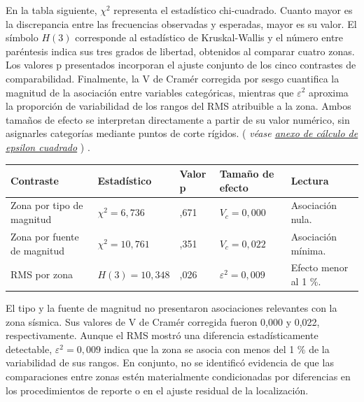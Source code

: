 \documentclass[
  spanish,
  letterpaper,
  DIV=11,
  numbers=noendperiod]{scrartcl}
\newcommand{\asesoriaParenRef}[1]{%
  \textnormal{\textcolor{asesoriaTextColor}{(}}%
  {\hypersetup{linkcolor=asesoriaLinkColor,urlcolor=asesoriaLinkColor,citecolor=asesoriaLinkColor}\textcolor{asesoriaTextColor}{\emph{#1}}}%
  \textnormal{\textcolor{asesoriaTextColor}{)}}%
}
\begin{document}
En la tabla siguiente, \(\chi^2\) representa el estadístico
chi-cuadrado. Cuanto mayor es la discrepancia entre las frecuencias
observadas y esperadas, mayor es su valor. El símbolo \(H(3)\)
corresponde al estadístico de Kruskal-Wallis y el número entre
paréntesis indica sus tres grados de libertad, obtenidos al comparar
cuatro zonas. Los valores p presentados incorporan el ajuste conjunto de
los cinco contrastes de comparabilidad. Finalmente, la V de Cramér
corregida por sesgo cuantifica la magnitud de la asociación entre
variables categóricas, mientras que \(\varepsilon^2\) aproxima la
proporción de variabilidad de los rangos del RMS atribuible a la zona.
Ambos tamaños de efecto se interpretan directamente a partir de su valor
numérico, sin asignarles categorías mediante puntos de corte rígidos.
\asesoriaParenRef{véase \hyperref[sec-anexo-epsilon]{anexo de cálculo de epsilon cuadrado}}.

\begingroup
\scriptsize
\centering
\setlength{\tabcolsep}{2.2pt}
\renewcommand{\arraystretch}{0.82}
{}
\label{tbl-comparabilidad-zonas}
\hypertarget{dest-tbl-comparabilidad-zonas}{}
\begin{tabular}{>{\raggedright\arraybackslash}p{}
                >{\centering\arraybackslash}p{}
                >{\centering\arraybackslash}p{}
                >{\centering\arraybackslash}p{}
                >{\raggedright\arraybackslash}p{}}
\toprule
Contraste & Estadístico & Valor p & Tamaño de efecto & Lectura \\
\midrule
Zona por tipo de magnitud & $\chi^2=6{,}736$ & 0,671 & $V_{c}=0{,}000$ & Asociación nula. \\
Zona por fuente de magnitud & $\chi^2=10{,}761$ & 0,351 & $V_{c}=0{,}022$ & Asociación mínima. \\
RMS por zona & $H(3)=10{,}348$ & 0,026 & $\varepsilon^2=0{,}009$ & Efecto menor al 1 \%.\\
\bottomrule
\end{tabular}
\par\vspace{-0.85em}
\endgroup

El tipo y la fuente de magnitud no presentaron asociaciones relevantes
con la zona sísmica. Sus valores de V de Cramér corregida fueron 0,000 y
0,022, respectivamente. Aunque el RMS mostró una diferencia
estadísticamente detectable, \(\varepsilon^2=0{,}009\) indica que la
zona se asocia con menos del 1 \% de la variabilidad de sus rangos. En
conjunto, no se identificó evidencia de que las comparaciones entre
zonas estén materialmente condicionadas por diferencias en los
procedimientos de reporte o en el ajuste residual de la localización.
\end{document}
